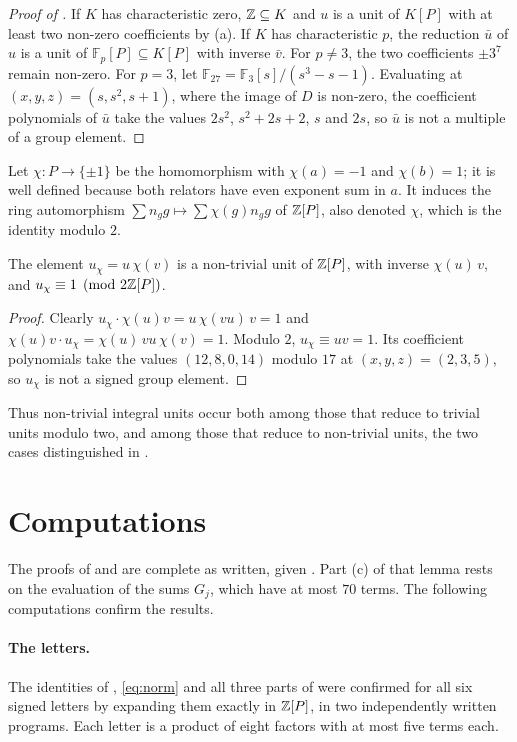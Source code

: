 \documentclass[11pt,colorlinks]{charlie}
\newcommand{\F}{\mathbb{F}}
\begin{document}
\begin{proof}[Proof of ]
If $K$ has characteristic zero, $\mathbb{Z}\subseteq K$ and $u$ is a unit of $K[P]$ with at least two non-zero coefficients by (a). If $K$ has characteristic $p$, the reduction $\bar u$ of $u$ is a unit of $\F_p[P]\subseteq K[P]$ with inverse $\bar v$. For $p\ne3$, the two coefficients $\pm3^7$ remain non-zero. For $p=3$, let $\F_{27}=\F_3[s]/(s^3-s-1)$. Evaluating at $(x,y,z)=(s,s^2,s+1)$, where the image of $D$ is non-zero, the coefficient polynomials of $\bar u$ take the values $2s^2$, $s^2+2s+2$, $s$ and $2s$, so $\bar u$ is not a multiple of a group element.
\end{proof}

Let $\chi\colon P\to\{\pm1\}$ be the homomorphism with $\chi(a)=-1$ and $\chi(b)=1$; it is well defined because both relators have even exponent sum in $a$. It induces the ring automorphism $\sum n_gg\mapsto\sum\chi(g)n_gg$ of $\mathbb{Z}[P]$, also denoted $\chi$, which is the identity modulo $2$.

\begin{proposition}\label{prop:mod2}
The element $u_\chi=u\,\chi(v)$ is a non-trivial unit of $\mathbb{Z}[P]$, with inverse $\chi(u)\,v$, and $u_\chi\equiv1\pmod{2\mathbb{Z}[P]}$.
\end{proposition}

\begin{proof}
Clearly $u_\chi\cdot\chi(u)v=u\,\chi(vu)\,v=1$ and $\chi(u)v\cdot u_\chi=\chi(u)\,vu\,\chi(v)=1$. Modulo $2$, $u_\chi\equiv uv=1$. Its coefficient polynomials take the values $(12,8,0,14)$ modulo $17$ at $(x,y,z)=(2,3,5)$, so $u_\chi$ is not a signed group element.
\end{proof}

Thus non-trivial integral units occur both among those that reduce to trivial units modulo two, and among those that reduce to non-trivial units, the two cases distinguished in \cite{Tabei}.

\section{Computations}\label{sec:computations}

The proofs of  and  are complete as written, given . Part (c) of that lemma rests on the evaluation of the sums $G_j$, which have at most $70$ terms. The following computations confirm the results.

\paragraph{The letters.} The identities of , \eqref{eq:norm} and all three parts of  were confirmed for all six signed letters by expanding them exactly in $\mathbb{Z}[P]$, in two independently written programs. Each letter is a product of eight factors with at most five terms each.
\end{document}
